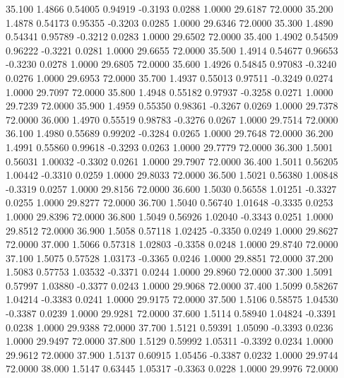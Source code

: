   35.100   1.4866   0.54005   0.94919  -0.3193   0.0288   1.0000  29.6187  72.0000
  35.200   1.4878   0.54173   0.95355  -0.3203   0.0285   1.0000  29.6346  72.0000
  35.300   1.4890   0.54341   0.95789  -0.3212   0.0283   1.0000  29.6502  72.0000
  35.400   1.4902   0.54509   0.96222  -0.3221   0.0281   1.0000  29.6655  72.0000
  35.500   1.4914   0.54677   0.96653  -0.3230   0.0278   1.0000  29.6805  72.0000
  35.600   1.4926   0.54845   0.97083  -0.3240   0.0276   1.0000  29.6953  72.0000
  35.700   1.4937   0.55013   0.97511  -0.3249   0.0274   1.0000  29.7097  72.0000
  35.800   1.4948   0.55182   0.97937  -0.3258   0.0271   1.0000  29.7239  72.0000
  35.900   1.4959   0.55350   0.98361  -0.3267   0.0269   1.0000  29.7378  72.0000
  36.000   1.4970   0.55519   0.98783  -0.3276   0.0267   1.0000  29.7514  72.0000
  36.100   1.4980   0.55689   0.99202  -0.3284   0.0265   1.0000  29.7648  72.0000
  36.200   1.4991   0.55860   0.99618  -0.3293   0.0263   1.0000  29.7779  72.0000
  36.300   1.5001   0.56031   1.00032  -0.3302   0.0261   1.0000  29.7907  72.0000
  36.400   1.5011   0.56205   1.00442  -0.3310   0.0259   1.0000  29.8033  72.0000
  36.500   1.5021   0.56380   1.00848  -0.3319   0.0257   1.0000  29.8156  72.0000
  36.600   1.5030   0.56558   1.01251  -0.3327   0.0255   1.0000  29.8277  72.0000
  36.700   1.5040   0.56740   1.01648  -0.3335   0.0253   1.0000  29.8396  72.0000
  36.800   1.5049   0.56926   1.02040  -0.3343   0.0251   1.0000  29.8512  72.0000
  36.900   1.5058   0.57118   1.02425  -0.3350   0.0249   1.0000  29.8627  72.0000
  37.000   1.5066   0.57318   1.02803  -0.3358   0.0248   1.0000  29.8740  72.0000
  37.100   1.5075   0.57528   1.03173  -0.3365   0.0246   1.0000  29.8851  72.0000
  37.200   1.5083   0.57753   1.03532  -0.3371   0.0244   1.0000  29.8960  72.0000
  37.300   1.5091   0.57997   1.03880  -0.3377   0.0243   1.0000  29.9068  72.0000
  37.400   1.5099   0.58267   1.04214  -0.3383   0.0241   1.0000  29.9175  72.0000
  37.500   1.5106   0.58575   1.04530  -0.3387   0.0239   1.0000  29.9281  72.0000
  37.600   1.5114   0.58940   1.04824  -0.3391   0.0238   1.0000  29.9388  72.0000
  37.700   1.5121   0.59391   1.05090  -0.3393   0.0236   1.0000  29.9497  72.0000
  37.800   1.5129   0.59992   1.05311  -0.3392   0.0234   1.0000  29.9612  72.0000
  37.900   1.5137   0.60915   1.05456  -0.3387   0.0232   1.0000  29.9744  72.0000
  38.000   1.5147   0.63445   1.05317  -0.3363   0.0228   1.0000  29.9976  72.0000
